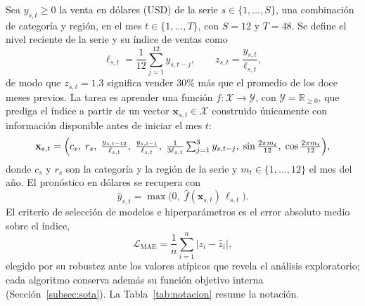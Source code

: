 \documentclass[pdflatex,sn-mathphys-num]{sn-jnl}
\begin{document}
Sea $y_{s,t}\ge 0$ la venta en dólares (USD) de la serie $s\in\{1,\dots,S\}$, una combinación de categoría y región, en el mes $t\in\{1,\dots,T\}$, con $S=12$ y $T=48$. Se define el nivel reciente de la serie y su índice de ventas como
\begin{equation}
\ell_{s,t}=\frac{1}{12}\sum_{j=1}^{12}y_{s,t-j},\qquad z_{s,t}=\frac{y_{s,t}}{\ell_{s,t}},
\label{eq:indice}
\end{equation}
de modo que $z_{s,t}=1.3$ significa vender 30\% más que el promedio de los doce meses previos. La tarea es aprender una función $f:\mathcal{X}\to\mathcal{Y}$, con $\mathcal{Y}=\mathbb{R}_{\ge 0}$, que prediga el índice a partir de un vector $\mathbf{x}_{s,t}\in\mathcal{X}$ construido únicamente con información disponible antes de iniciar el mes $t$:
\begin{equation}
\mathbf{x}_{s,t}=\Bigl(c_s,\;r_s,\;\tfrac{y_{s,t-12}}{\ell_{s,t}},\;\tfrac{y_{s,t-1}}{\ell_{s,t}},\;\tfrac{1}{3\ell_{s,t}}\textstyle\sum_{j=1}^{3}y_{s,t-j},\;\sin\tfrac{2\pi m_t}{12},\;\cos\tfrac{2\pi m_t}{12}\Bigr),
\label{eq:x}
\end{equation}
donde $c_s$ y $r_s$ son la categoría y la región de la serie y $m_t\in\{1,\dots,12\}$ el mes del año. El pronóstico en dólares se recupera con
\begin{equation}
\hat{y}_{s,t}=\max\bigl(0,\;\hat{f}(\mathbf{x}_{s,t})\,\ell_{s,t}\bigr).
\label{eq:retorno}
\end{equation}
El criterio de selección de modelos e hiperparámetros es el error absoluto medio sobre el índice,
\begin{equation}
\mathcal{L}_{\mathrm{MAE}}=\frac{1}{n}\sum_{i=1}^{n}\bigl|z_i-\hat{z}_i\bigr|,
\label{eq:perdida}
\end{equation}
elegido por su robustez ante los valores atípicos que revela el análisis exploratorio; cada algoritmo conserva además su función objetivo interna (Sección~\ref{subsec:sota}). La Tabla~\ref{tab:notacion} resume la notación.
\end{document}
